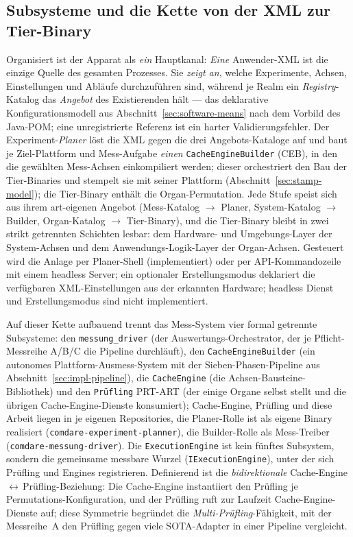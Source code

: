 \begin{nurkurz}
\subsection{Subsysteme und die Kette von der XML zur Tier-Binary}\label{sec:mess-chain}
Organisiert ist der Apparat als \emph{ein} Hauptkanal: \emph{Eine} Anwender-XML ist die einzige Quelle des
gesamten Prozesses. Sie \emph{zeigt an}, welche Experimente, Achsen, Einstellungen und Abläufe durchzuführen
sind, während je Realm ein \emph{Registry}-Katalog das \emph{Angebot} des Existierenden hält --- das deklarative
Konfigurationsmodell aus Abschnitt~\ref{sec:software-means} nach dem Vorbild des Java-POM\@; eine
unregistrierte Referenz ist ein harter Validierungsfehler. Der Experiment-\emph{Planer} löst die XML gegen die
drei Angebots-Kataloge auf und baut je Ziel-Plattform und Mess-Aufgabe \emph{einen} \texttt{CacheEngineBuilder}
(CEB), in den die gewählten Mess-Achsen einkompiliert werden; dieser orchestriert den Bau der Tier-Binaries und
stempelt sie mit seiner Plattform (Abschnitt~\ref{sec:stamp-model}); die Tier-Binary enthält die
Organ-Permutation. Jede Stufe speist sich aus ihrem art-eigenen Angebot (Mess-Katalog $\to$ Planer,
System-Katalog $\to$ Builder, Organ-Katalog $\to$ Tier-Binary), und die Tier-Binary bleibt in zwei strikt
getrennten Schichten lesbar: dem Hardware- und Umgebungs-Layer der System-Achsen und dem Anwendungs-Logik-Layer
der Organ-Achsen. Gesteuert wird die Anlage per Planer-Shell (implementiert) oder per API-Kommandozeile mit
einem headless Server; ein optionaler Erstellungsmodus deklariert die verfügbaren XML-Einstellungen aus der
erkannten Hardware; headless Dienst und Erstellungsmodus sind nicht implementiert.

Auf dieser Kette aufbauend trennt das Mess-System vier formal getrennte Subsysteme: den
\texttt{messung\_driver} (der Auswertungs-Orchestrator, der je Pflicht-Messreihe A/B/C die Pipeline durchläuft),
den \texttt{CacheEngineBuilder} (ein autonomes Plattform-Ausmess-System mit der Sieben-Phasen-Pipeline aus
Abschnitt~\ref{sec:impl-pipeline}), die \texttt{CacheEngine} (die Achsen-Bausteine-Bibliothek) und den
\texttt{Prüfling} PRT-ART (der einige Organe selbst stellt und die übrigen Cache-Engine-Dienste konsumiert);
Cache-Engine, Prüfling und diese Arbeit liegen in je eigenen Repositories, die Planer-Rolle ist als eigene
Binary realisiert (\texttt{comdare-experiment-planner}), die Builder-Rolle als Mess-Treiber
(\texttt{comdare-messung-driver}). Die \texttt{ExecutionEngine} ist kein fünftes Subsystem, sondern die
gemeinsame messbare Wurzel (\texttt{IExecutionEngine}), unter der sich Prüfling und Engines registrieren.
Definierend ist die \emph{bidirektionale} Cache-Engine\,$\leftrightarrow$\,Prüfling-Beziehung: Die Cache-Engine
instantiiert den Prüfling je Permutations-Konfiguration, und der Prüfling ruft zur Laufzeit
Cache-Engine-Dienste auf; diese Symmetrie begründet die \emph{Multi-Prüfling}-Fähigkeit, mit der Messreihe~A
den Prüfling gegen viele SOTA-Adapter in einer Pipeline vergleicht.


\end{nurkurz}
